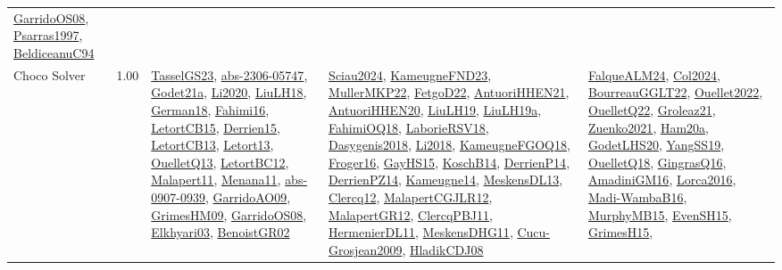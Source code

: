 {\begin{longtable}{p{3cm}r>{\raggedright\arraybackslash}p{6cm}>{\raggedright\arraybackslash}p{6cm}>{\raggedright\arraybackslash}p{8cm}}
\hyperref[detail:GarridoOS08]{GarridoOS08}, \hyperref[detail:Psarras1997]{Psarras1997}, \hyperref[detail:BeldiceanuC94]{BeldiceanuC94}\\
\index{Choco Solver}\index{CPSystems!Choco Solver}Choco Solver &  1.00 & \hyperref[detail:TasselGS23]{TasselGS23}, \hyperref[detail:abs-2306-05747]{abs-2306-05747}, \hyperref[detail:Godet21a]{Godet21a}, \hyperref[detail:Li2020]{Li2020}, \hyperref[detail:LiuLH18]{LiuLH18}, \hyperref[detail:German18]{German18}, \hyperref[detail:Fahimi16]{Fahimi16}, \hyperref[detail:LetortCB15]{LetortCB15}, \hyperref[detail:Derrien15]{Derrien15}, \hyperref[detail:LetortCB13]{LetortCB13}, \hyperref[detail:Letort13]{Letort13}, \hyperref[detail:OuelletQ13]{OuelletQ13}, \hyperref[detail:LetortBC12]{LetortBC12}, \hyperref[detail:Malapert11]{Malapert11}, \hyperref[detail:Menana11]{Menana11}, \hyperref[detail:abs-0907-0939]{abs-0907-0939}, \hyperref[detail:GarridoAO09]{GarridoAO09}, \hyperref[detail:GrimesHM09]{GrimesHM09}, \hyperref[detail:GarridoOS08]{GarridoOS08}, \hyperref[detail:Elkhyari03]{Elkhyari03}, \hyperref[detail:BenoistGR02]{BenoistGR02} & \hyperref[detail:Sciau2024]{Sciau2024}, \hyperref[detail:KameugneFND23]{KameugneFND23}, \hyperref[detail:MullerMKP22]{MullerMKP22}, \hyperref[detail:FetgoD22]{FetgoD22}, \hyperref[detail:AntuoriHHEN21]{AntuoriHHEN21}, \hyperref[detail:AntuoriHHEN20]{AntuoriHHEN20}, \hyperref[detail:LiuLH19]{LiuLH19}, \hyperref[detail:LiuLH19a]{LiuLH19a}, \hyperref[detail:FahimiOQ18]{FahimiOQ18}, \hyperref[detail:LaborieRSV18]{LaborieRSV18}, \hyperref[detail:Dasygenis2018]{Dasygenis2018}, \hyperref[detail:Li2018]{Li2018}, \hyperref[detail:KameugneFGOQ18]{KameugneFGOQ18}, \hyperref[detail:Froger16]{Froger16}, \hyperref[detail:GayHS15]{GayHS15}, \hyperref[detail:KoschB14]{KoschB14}, \hyperref[detail:DerrienP14]{DerrienP14}, \hyperref[detail:DerrienPZ14]{DerrienPZ14}, \hyperref[detail:Kameugne14]{Kameugne14}, \hyperref[detail:MeskensDL13]{MeskensDL13}, \hyperref[detail:Clercq12]{Clercq12}, \hyperref[detail:MalapertCGJLR12]{MalapertCGJLR12}, \hyperref[detail:MalapertGR12]{MalapertGR12}, \hyperref[detail:ClercqPBJ11]{ClercqPBJ11}, \hyperref[detail:HermenierDL11]{HermenierDL11}, \hyperref[detail:MeskensDHG11]{MeskensDHG11}, \hyperref[detail:Cucu-Grosjean2009]{Cucu-Grosjean2009}, \hyperref[detail:HladikCDJ08]{HladikCDJ08} & \hyperref[detail:FalqueALM24]{FalqueALM24}, \hyperref[detail:Col2024]{Col2024}, \hyperref[detail:BourreauGGLT22]{BourreauGGLT22}, \hyperref[detail:Ouellet2022]{Ouellet2022}, \hyperref[detail:OuelletQ22]{OuelletQ22}, \hyperref[detail:Groleaz21]{Groleaz21}, \hyperref[detail:Zuenko2021]{Zuenko2021}, \hyperref[detail:Ham20a]{Ham20a}, \hyperref[detail:GodetLHS20]{GodetLHS20}, \hyperref[detail:YangSS19]{YangSS19}, \hyperref[detail:OuelletQ18]{OuelletQ18}, \hyperref[detail:GingrasQ16]{GingrasQ16}, \hyperref[detail:AmadiniGM16]{AmadiniGM16}, \hyperref[detail:Lorca2016]{Lorca2016}, \hyperref[detail:Madi-WambaB16]{Madi-WambaB16}, \hyperref[detail:MurphyMB15]{MurphyMB15}, \hyperref[detail:EvenSH15]{EvenSH15}, \hyperref[detail:GrimesH15]{GrimesH15}, 
\end{longtable}}
